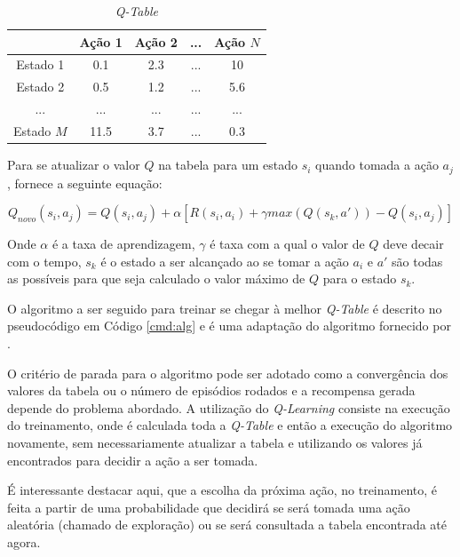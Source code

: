 \begin{table}[hbt]
    \centering
    \begin{tabular}{c|c|c|c|c}
         & Ação 1 & Ação 2 & ... & Ação $N$ \\ \hline
        Estado 1 & 0.1 & 2.3 & ... & 10 \\
        Estado 2 & 0.5 & 1.2 & ... & 5.6 \\
        ... & ... & ... & ... & ... \\
        Estado $M$ & 11.5 & 3.7 & ... & 0.3 \\
    \end{tabular}
    \caption{\textit{Q-Table}}
    \label{tab:qTable}
\end{table} 

Para se atualizar o valor $Q$ na tabela para um estado $s_i$ quando tomada a ação $a_j$,
 fornece a seguinte equação:

\begin{equation}
    Q_{novo}(s_i, a_j)=Q(s_i, a_j)+\alpha[R(s_i, a_i)+\gamma max(Q(s_k, a'))-Q(s_i, a_j)]
    \label{novoQ}
\end{equation}

Onde $\alpha$ é a taxa de aprendizagem, $\gamma$ é taxa com a qual o valor de $Q$ deve decair com o
tempo, $s_k$ é o estado a ser alcançado ao se tomar a ação $a_i$ e $a'$ são todas as possíveis para
que seja calculado o valor máximo de $Q$ para o estado $s_k$.

O algoritmo a ser seguido para treinar se chegar à melhor \textit{Q-Table} é descrito no
pseudocódigo em Código \ref{cmd:alg} e é uma adaptação do algoritmo fornecido por
.


O critério de parada para o algoritmo pode ser adotado como a convergência dos valores da tabela ou
o número de episódios rodados e a recompensa gerada depende do problema abordado. A utilização do
\textit{Q-Learning} consiste na execução do treinamento, onde é calculada toda a \textit{Q-Table} e
então a execução do algoritmo novamente, sem necessariamente atualizar a tabela e utilizando os
valores já encontrados para decidir a ação a ser tomada.

É interessante destacar aqui, que a escolha da próxima ação, no treinamento, é feita a partir de uma
probabilidade que decidirá se será tomada uma ação aleatória (chamado de exploração) ou se será
consultada a tabela encontrada até agora.


